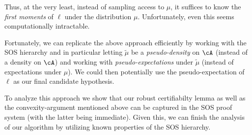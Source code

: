 Thus, at the very least, instead of sampling access to $\mu$, it suffices to know the \emph{first moments} of $\ell$ under the distribution $\mu$. Unfortunately, even this seems computationally intractable. 

Fortunately, we can replicate the above approach efficiently by working with the SOS hierarchy and in particular letting $\widetilde{\mu}$ be a \emph{pseudo-density} on $\cA$ (instead of a density on $\cA$) and working with \emph{pseudo-expectations} under $\widetilde{\mu}$ (instead of expectations under $\mu$). We could then potentially use the pseudo-expectation of $\ell$ as our final candidate hypothesis. 

To analyze this approach we show that our robust certifiabilty lemma as well as the convexity-argument mentioned above can be captured in the SOS proof system (with the latter being immediate). Given this, we can finish the analysis of our algorithm by utilizing known properties of the SOS hierarchy.  

